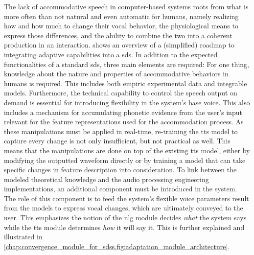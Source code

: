 The lack of accommodative speech in computer-based systems roots from what is more often than not natural and even automatic for humans, namely realizing how and how much to change their vocal behavior, the physiological means to express those differences, and the ability to combine the two into a coherent production in an interaction.
 shows an overview of a (simplified) roadmap to integrating adaptive capabilities into a \ac{sds}.
In addition to the expected functionalities of a standard \ac{sds}, three main elements are required:
For one thing, knowledge about the nature and properties of accommodative behaviors in humans is required.
This includes both empiric experimental data and integrable models.
Furthermore, the technical capability to control the speech output on demand is essential for introducing flexibility in the system's base voice.
This also includes a mechanism for accumulating phonetic evidence from the user's input relevant for the feature representations used for the accommodation process.
As these manipulations must be applied in real-time, re-training the \ac{tts} model to capture every change is not only insufficient, but not practical as well.
This means that the manipulations are done on top of the existing \ac{tts} model, either by modifying the outputted waveform directly or by training a model that can take specific changes in feature description into consideration.
To link between the modeled theoretical knowledge and the audio processing engineering implementations, an additional component must be introduced in the system.
The role of this component is to feed the system's flexible voice parameters result from the models to express vocal changes, which are ultimately conveyed to the user.
This emphasizes the notion of the \ac{nlg} module decides \emph{what} the system says while the \ac{tts} module determines \emph{how} it will say it.
This is further explained and illustrated in \cref{chap:convergence_module_for_sdss,fig:adaptation_module_architecture}.

